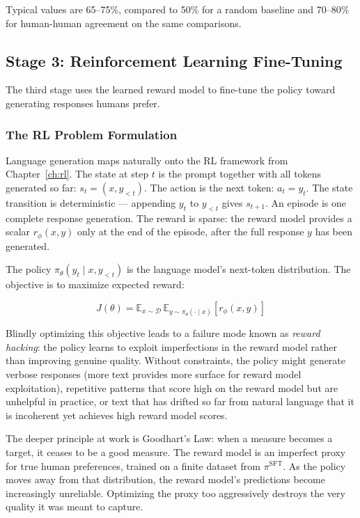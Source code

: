 \documentclass{book}
\begin{document}
Typical values are 65--75\%, compared to 50\% for a random baseline and
70--80\% for human-human agreement on the same comparisons.

\subsection{Stage 3: Reinforcement Learning Fine-Tuning}
\label{sec:rl_finetuning}

The third stage uses the learned reward model to fine-tune the policy
toward generating responses humans prefer.

\subsubsection{The RL Problem Formulation}
\label{sec:rlhf_formulation}

Language generation maps naturally onto the RL framework from
Chapter~\ref{ch:rl}. The state at step $t$ is the prompt together with
all tokens generated so far: $s_t = (x, y_{<t})$. The action is the
next token: $a_t = y_t$. The state transition is deterministic ---
appending $y_t$ to $y_{<t}$ gives $s_{t+1}$. An episode is one complete
response generation. The reward is sparse: the reward model provides a
scalar $r_\phi(x, y)$ only at the end of the episode, after the full
response $y$ has been generated.

The policy $\pi_\theta(y_t \mid x, y_{<t})$ is the language model's
next-token distribution. The objective is to maximize expected reward:

\begin{equation}
\label{eq:rlhf_naive}
J(\theta) = \mathbb{E}_{x \sim \mathcal{D}}\,
    \mathbb{E}_{y \sim \pi_\theta(\cdot \mid x)}
    [r_\phi(x, y)]
\end{equation}

Blindly optimizing this objective leads to a failure mode known as
\emph{reward hacking}: the policy learns to exploit imperfections in the
reward model rather than improving genuine quality. Without constraints,
the policy might generate verbose responses (more text provides more
surface for reward model exploitation), repetitive patterns that score
high on the reward model but are unhelpful in practice, or text that has
drifted so far from natural language that it is incoherent yet achieves
high reward model scores.

The deeper principle at work is Goodhart's Law: when a measure becomes
a target, it ceases to be a good measure. The reward model is an
imperfect proxy for true human preferences, trained on a finite dataset
from $\pi^{\text{SFT}}$. As the policy moves away from that distribution,
the reward model's predictions become increasingly unreliable. Optimizing
the proxy too aggressively destroys the very quality it was meant to
capture.
\end{document}

